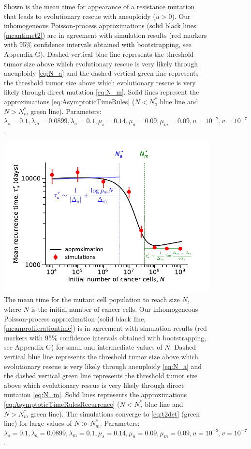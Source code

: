 \documentclass[12pt]{extarticle}
\begin{document}
\begin{appendices}
\begin{figure}
\caption{Shown is the mean time for appearance of a resistance mutation that leads to evolutionary rescue with aneuploidy ($u>0$). Our inhomogeneous Poisson-process approximations (solid black lines: \cref{meantimet2}) are in agreement with simulation results (red markers with 95\% confidence intervals obtained with bootstrapping, see Appendix G). Dashed vertical blue line represents the threshold tumor size above which evolutionary rescue is very likely through aneuploidy \cref{eq:N_a} and the dashed vertical green line represents the threshold tumor size above which evolutionary rescue is very likely through direct mutation \cref{eq:N_m}. Solid lines represent the approximations \cref{eq:AsymptoticTimeRules} ($N<N_a^*$ blue line and $N>N_m^*$ green line). 
Parameters: $\lambda_s=0.1,\lambda_m=0.0899,\lambda_a=0.1,\mu_s=0.14,\mu_a=0.09,\mu_m=0.09, u=10^{-2}, v=10^{-7}$.} %
\label{EvolutionaryRescueTimeComplete}
\end{figure}
\begin{figure}
\vspace*{1\baselineskip}
\includegraphics[width=1\textwidth]{Figures/ProliferationTimeLarge.pdf} %
\caption{The mean time for the mutant cell population to reach size $N$, where $N$ is the initial number of cancer cells.
Our inhomogeneous Poisson-process approximation (solid black line, \cref{meanproliferationtime}) is in agreement with simulation results (red markers with 95\% confidence intervals obtained with bootstrapping, see Appendix G) for small and intermediate values of $N$. Dashed vertical blue line represents the threshold tumor size above which evolutionary rescue is very likely through aneuploidy \cref{eq:N_a} and the dashed vertical green line represents the threshold tumor size above which evolutionary rescue is very likely through direct mutation \cref{eq:N_m}. Solid lines represents the approximations \cref{eq:AsymptoticTimeRulesRecurrence} ($N<N_a^*$ blue line and $N>N_m^*$ green line). The simulations converge to \cref{eq:t2det} (green line) for large values of $N\gg N_m^*$.  Parameters: $\lambda_s=0.1,\lambda_a=0.0899,\lambda_m=0.1,\mu_s=0.14,\mu_a=0.09,\mu_m=0.09, u=10^{-2}, v=10^{-7}$.}

\end{figure}
\end{appendices}
\end{document}
